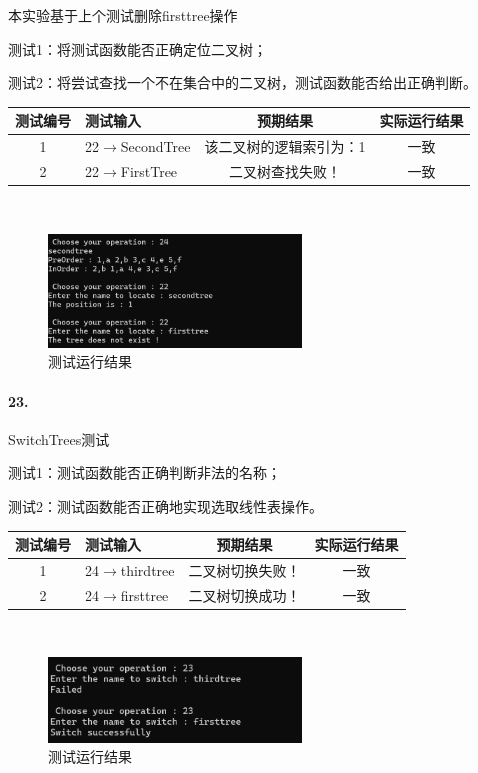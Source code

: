 \documentclass[supercite]{Experimental_Report}
\theoremstyle{definition}
\begin{document}
本实验基于上个测试删除firsttree操作

测试1：将测试函数能否正确定位二叉树；

测试2：将尝试查找一个不在集合中的二叉树，测试函数能否给出正确判断。

\vspace{0.5em}

\begin{tabular}{|c|p{2.7cm}|c|c|}
	\hline
	测试编号 & 测试输入 & 预期结果 & 实际运行结果 \\
	\hline
	1 & 22$\rightarrow$SecondTree & 该二叉树的逻辑索引为：1 & 一致 \\
	\hline
	2 & 22$\rightarrow$FirstTree & 二叉树查找失败！ & 一致 \\
	\hline
\end{tabular}

~\

\begin{figure}[H]
 	\centering
 	\includegraphics[width=0.6\textwidth]{images/二叉树测试22.png}
 	\caption{测试运行结果}
 	\label{txlab}
 \end{figure}

\paragraph{23.}SwitchTrees测试
	
测试1：测试函数能否正确判断非法的名称；

测试2：测试函数能否正确地实现选取线性表操作。

\vspace{0.5em}

\begin{tabular}{|c|p{2.7cm}|c|c|}
	\hline
	测试编号 & 测试输入 & 预期结果 & 实际运行结果 \\
	\hline
	1 & 24$\rightarrow$thirdtree & 二叉树切换失败！ & 一致 \\
	\hline
	2 & 24$\rightarrow$firsttree & 二叉树切换成功！ & 一致 \\
	\hline
\end{tabular}

~\

\begin{figure}[H]
 	\centering
 	\includegraphics[width=0.6\textwidth]{images/二叉树测试23.png}
 	\caption{测试运行结果}
 	\label{txlab}
 \end{figure}
\end{document}
